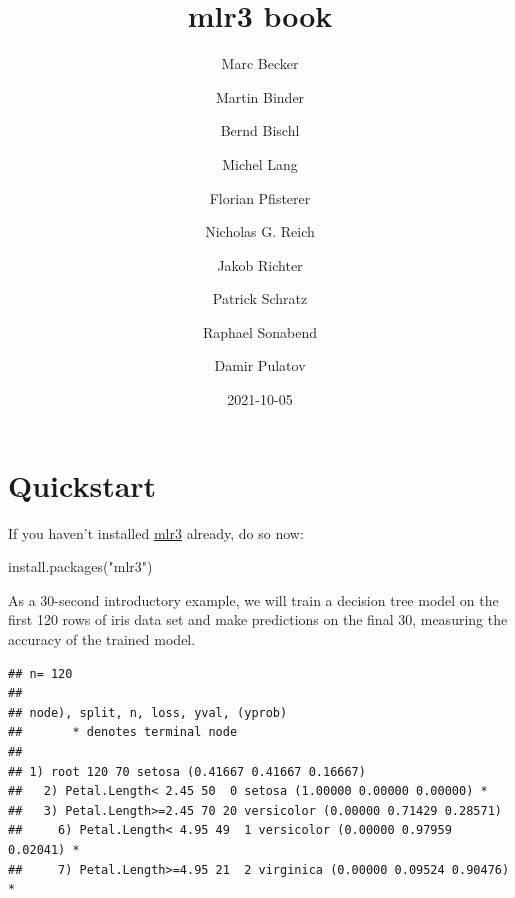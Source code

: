 \documentclass[
]{scrbook}
\title{mlr3 book}
\author{Marc Becker \and Martin Binder \and Bernd Bischl \and Michel Lang \and Florian Pfisterer \and Nicholas G. Reich \and Jakob Richter \and Patrick Schratz \and Raphael Sonabend \and Damir Pulatov}
\date{2021-10-05}
\newenvironment{Shaded}{\begin{snugshade}}{\end{snugshade}}
\newcommand{\AttributeTok}[1]{\textcolor[rgb]{0.77,0.63,0.00}{#1}}
\newcommand{\CommentTok}[1]{\textcolor[rgb]{0.56,0.35,0.01}{\textit{#1}}}
\newcommand{\DecValTok}[1]{\textcolor[rgb]{0.00,0.00,0.81}{#1}}
\newcommand{\FunctionTok}[1]{\textcolor[rgb]{0.00,0.00,0.00}{#1}}
\newcommand{\NormalTok}[1]{#1}
\newcommand{\OtherTok}[1]{\textcolor[rgb]{0.56,0.35,0.01}{#1}}
\newcommand{\SpecialCharTok}[1]{\textcolor[rgb]{0.00,0.00,0.00}{#1}}
\newcommand{\StringTok}[1]{\textcolor[rgb]{0.31,0.60,0.02}{#1}}
\renewenvironment{Shaded} {\begin{snugshade}\small} {\end{snugshade}}
\begin{document}
\maketitle

{
\hypersetup{linkcolor=}
\setcounter{tocdepth}{1}
\tableofcontents
}
\hypertarget{quickstart}{%
\chapter*{Quickstart}\label{quickstart}}

If you haven't installed \href{https://mlr3.mlr-org.com}{mlr3} already, do so now:

\begin{Shaded}
\begin{Highlighting}[]
\FunctionTok{install.packages}\NormalTok{(}\StringTok{"mlr3"}\NormalTok{)}
\end{Highlighting}
\end{Shaded}

As a 30-second introductory example, we will train a decision tree model on the first 120 rows of iris data set and make predictions on the final 30, measuring the accuracy of the trained model.

\begin{Shaded}
\end{Shaded}

\begin{verbatim}
## n= 120 
## 
## node), split, n, loss, yval, (yprob)
##       * denotes terminal node
## 
## 1) root 120 70 setosa (0.41667 0.41667 0.16667)  
##   2) Petal.Length< 2.45 50  0 setosa (1.00000 0.00000 0.00000) *
##   3) Petal.Length>=2.45 70 20 versicolor (0.00000 0.71429 0.28571)  
##     6) Petal.Length< 4.95 49  1 versicolor (0.00000 0.97959 0.02041) *
##     7) Petal.Length>=4.95 21  2 virginica (0.00000 0.09524 0.90476) *
\end{verbatim}
\end{document}
